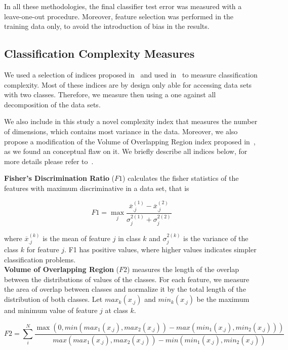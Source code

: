 \documentclass[10pt]{bmc_article}
\newenvironment{bmcformat}{\begin{raggedright}\baselineskip20pt\sloppy\setboolean{publ}{false}}{\end{raggedright}\baselineskip20pt\sloppy}
\begin{document}
\begin{bmcformat}
In all these methodologies, the final classifier test error was measured
with a leave-one-out procedure. Moreover, feature selection was
performed in the training data only, to avoid the introduction of bias
in the results.

\subsection*{Classification Complexity Measures}

We used a selection of indices proposed in~\cite{Ho2002} and used
in~\cite{Costa2009b} to measure classification complexity. Most of
these indices are by design only able for accessing data sets with two
classes. Therefore, we measure then using a one against all decomposition of
the data sets.

We also include in this study a novel complexity index that measures
the number of dimensions, which contains most variance in the
data. Moreover, we also propose a modification of the Volume
of Overlapping Region index proposed in~\cite{Ho2002}, as we found an
conceptual flaw on it. We briefly describe all indices below, for more
details please refer to~\cite{Ho2002,Costa2009b}.


{\bf Fisher's Discrimination Ratio} ($F1$) calculates the fisher statistics of the
features with maximum discriminative in a data set, that is

\begin{equation}
F1=\max_{j}\frac{\overline{x}^{(1)}_{.j} - \overline{x}^{(2)}_{.j}}{\sigma^{2(1)}_{j} +\sigma^{2(2)}_{j} }
\end{equation}

\noindent
where $\overline{x}^{(k)}_{.j}$ is the mean of feature $j$ in class
$k$ and $\sigma^{2(k)}_{j}$ is the variance of the class $k$ for
feature $j$. F1 has positive values, where higher values indicates
simpler classification problems.\\


{\bf Volume of Overlapping Region} ($F2$) measures the length of the
overlap between the distributions of values of the classes. For
each feature, we measure the area of overlap between classes and
normalize it by the total length of the distribution of both classes.
Let $max_{k}(x_{.j})$ and $min_{k}(x_{.j})$ be the maximum and minimum
value of feature $j$ at class $k$.

\begin{equation}
F2=\sum^N_{i} \frac{ \max(0,min(max_1(x_{.j}),max_2(x_{.j})) -
max(min_1(x_{.j}),min_2(x_{.j})))} {max(max_1(x_{.j}),max_2(x_{.j})) -
min(min_1(x_{.j}),min_2(x_{.j}))}
\end{equation}


\end{bmcformat}
\end{document}
